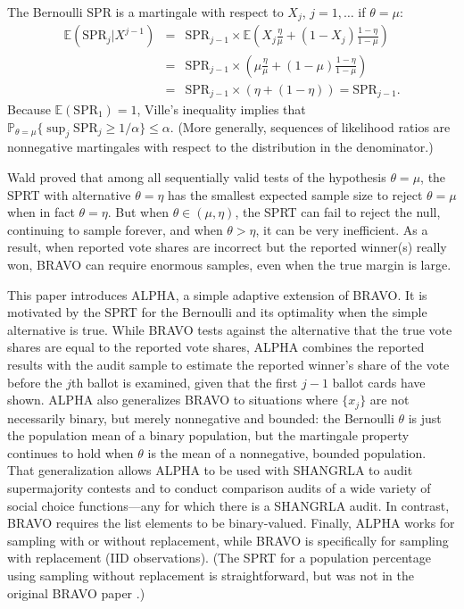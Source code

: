 \documentclass[12pt,runningheads]{llncs}
\newcommand{\EE}{\mathbb{E}}
\newcommand{\SPR}{\ensuremath{\mathrm{SPR}}}
\renewcommand{\Pr}{\mathbb{P}}
\begin{document}
{The Bernoulli \SPR{} is a martingale with respect to $X_j$, $j=1, \ldots$ if $\theta = \mu$:
\begin{eqnarray}
\EE (\SPR_j | X^{j-1}) &=& \SPR_{j-1} \times \EE \left ( X_j \frac{\eta}{\mu} + (1-X_j) \frac{1-\eta}{1-\mu} \right ) \nonumber \\
&=& \SPR_{j-1} \times \left ( \mu \frac{\eta}{\mu} + (1-\mu) \frac{1-\eta}{1-\mu} \right )  \nonumber \\
&=& \SPR_{j-1} \times \left (\eta + (1-\eta) \right ) = \SPR_{j-1}.
\end{eqnarray}
Because $ \EE (\SPR_1) = 1$, Ville's inequality implies that $\Pr_{\theta = \mu} \{\sup_j \SPR_j \ge 1/\alpha \} \le \alpha$.
(More generally, sequences of likelihood ratios are nonnegative martingales with respect to the distribution in the
denominator.)

Wald \cite{wald45} proved that among all sequentially valid tests of the hypothesis $\theta = \mu$, the SPRT with alternative
$\theta = \eta$ has the smallest expected sample size to reject $\theta=\mu$ when in fact $\theta = \eta$.
But when $\theta \in (\mu, \eta)$, the SPRT can fail to reject the null, continuing to sample forever,
and when $\theta > \eta$, it can be very inefficient.
As a result, when reported vote shares are incorrect but the reported winner(s) really won, BRAVO can require 
enormous samples, even when the true margin is large.

This paper introduces ALPHA, a simple adaptive extension of BRAVO.
It is motivated by the SPRT for the Bernoulli and its optimality when the simple alternative is true.
While BRAVO tests against the alternative that the true vote shares are equal to the reported vote shares,
ALPHA combines the reported results with the audit sample to
estimate the reported winner's share of the vote before the $j$th ballot is examined, given
that the first $j-1$ ballot cards have shown. 
ALPHA also generalizes BRAVO to situations where $\{x_j\}$ are not necessarily binary, 
but merely nonnegative and bounded: the Bernoulli $\theta$ is just the population mean of a binary population,
but the martingale property continues to hold when $\theta$ is the mean of a nonnegative, bounded population.
That generalization allows ALPHA to be used with SHANGRLA to audit supermajority contests
and to conduct comparison audits of a wide variety of social choice functions---any for which there is a
SHANGRLA audit.
In contrast, BRAVO requires the list elements to be binary-valued.
Finally, ALPHA works for sampling with or without replacement, while BRAVO is specifically for sampling 
with replacement (IID observations).
(The SPRT for a population percentage using sampling without replacement is straightforward, but was not
in the original BRAVO paper \cite{lindemanEtal12}.)

}
\end{document}
